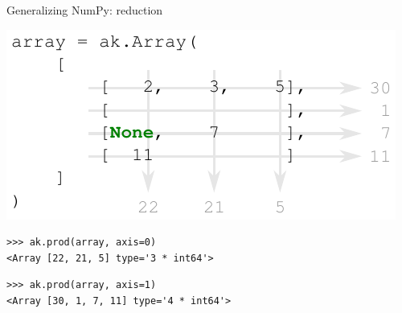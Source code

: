 \documentclass[aspectratio=169]{beamer}
\begin{document}
\begin{frame}[fragile]{Generalizing NumPy: reduction}
\vspace{0.5 cm}

\includegraphics[width=8 cm]{img/reduction.pdf}


\begin{verbatim}
>>> ak.prod(array, axis=0)
<Array [22, 21, 5] type='3 * int64'>
\end{verbatim}

\begin{verbatim}
>>> ak.prod(array, axis=1)
<Array [30, 1, 7, 11] type='4 * int64'>
\end{verbatim}
\end{frame}
\end{document}
